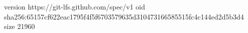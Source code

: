 version https://git-lfs.github.com/spec/v1
oid sha256:65157cf622eac1795f4f5f6703579635d310473166585515fc4c144ed2d5b3d4
size 21960
